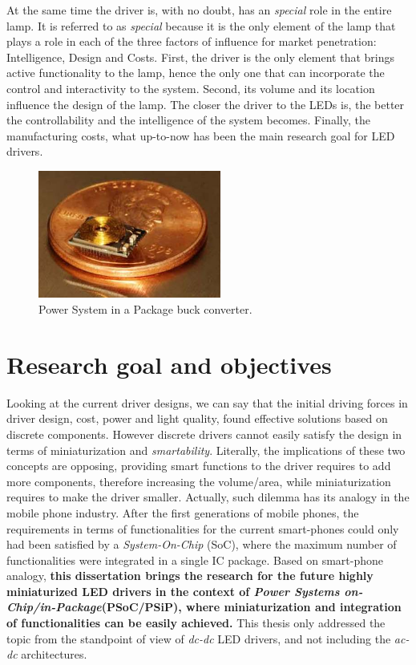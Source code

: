 At the same time the driver is, with no doubt, has an \emph{special} role in the entire lamp. It is referred to as \emph{special} because it is the only element of the lamp that plays a role in each of the three factors of influence for market penetration: Intelligence, Design and Costs. First, the driver is the only element that brings active functionality to the lamp, hence the only one that can incorporate the control and interactivity to the system. Second, its volume and its location influence the design of the lamp. The closer the driver to the LEDs is, the better the controllability and the intelligence of the system becomes. Finally, the manufacturing costs, what up-to-now has been the main research goal for LED drivers.

\begin{figure}[!h]
    \centering
    \includegraphics[width=6cm]{./0_intro/img/FSolzbacher01.jpg}
    \caption{Power System in a Package buck converter.}
    \label{fig:psoc_example}
\end{figure}

\section{Research goal and objectives}
Looking at the current driver designs, we can say that the initial driving forces in driver design, cost, power and light quality, found effective solutions based on discrete components. However discrete drivers cannot easily satisfy the design in terms of miniaturization and \emph{smartability}. Literally, the implications of these two concepts are opposing, providing smart functions to the driver requires to add more components, therefore increasing the volume/area, while miniaturization requires to make the driver smaller. Actually, such dilemma has its analogy in the mobile phone industry. After the first generations of mobile phones, the requirements in terms of functionalities for the current smart-phones could only had been satisfied by a \emph{System-On-Chip} (SoC), where the maximum number of functionalities were integrated in a single IC package. Based on smart-phone analogy, \textbf{this dissertation brings the research for the future highly miniaturized LED drivers in the context of \emph{Power Systems on-Chip/in-Package}(PSoC/PSiP), where miniaturization and integration of functionalities can be easily achieved.} This thesis only addressed the topic from the standpoint of view of \emph{dc-dc} LED drivers, and not including the \emph{ac-dc} architectures.



